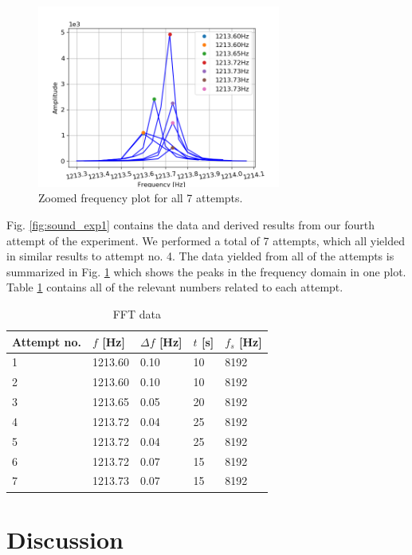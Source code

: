 \documentclass[11pt,a4paper]{article}
\begin{document}
    \begin{figure}[H]
      \centering 
      \includegraphics[width=8cm]{scripts/freq_exp2_all.png}
      \caption{Zoomed frequency plot for all 7 attempts.}
      \label{fig:sound_all}
    \end{figure}
    
    Fig. \ref{fig:sound_exp1} contains the data and derived results from our fourth attempt of the experiment. We performed a total of 7 attempts, which all yielded in similar results to attempt no. 4. The data yielded from all of the attempts is summarized in Fig. \ref{fig:sound_all} which shows the peaks in the frequency domain in one plot.
    Table \ref{tab:fftdat} contains all of the relevant numbers related to each attempt. 


    \begin{table}[H]
      \center
      \caption{FFT data}
      \begin{tabular}{ | l | p{1.4cm} | l | l | l |}
          \hline
          Attempt no. & $f$ [Hz] & $\Delta f$ [Hz] & $t$ [s] & $f_s$ [Hz]\\ \hline
          1 & 1213.60 & 0.10 & 10 & 8192\\ \hline
          2 & 1213.60 & 0.10 & 10 & 8192\\ \hline
          3 & 1213.65 & 0.05 & 20 & 8192\\ \hline
          4 & 1213.72 & 0.04 & 25 & 8192\\ \hline
          5 & 1213.72 & 0.04 & 25 & 8192\\ \hline
          6 & 1213.72 & 0.07 & 15 & 8192\\ \hline
          7 & 1213.73 & 0.07 & 15 & 8192\\ \hline
      \end{tabular}
      \label{tab:fftdat}
    \end{table}


\newpage
\section{\label{sect:discussion}Discussion}
 
\end{document}
